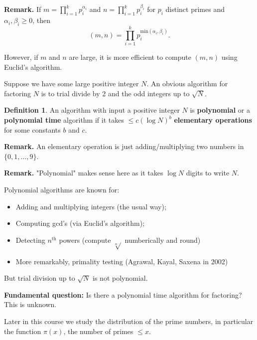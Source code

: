 \documentclass{article}
\theoremstyle{definition}
\newtheorem{defn}[theorem]{Definition}
\theoremstyle{remark}
\begin{document}
\textbf{Remark.} If $m = \prod_{i=1}^{k} p_i^{\alpha_i}$ and $n = \prod_{i=1}^{k} p_i^{\beta_i}$ for $p_i$ distinct primes and $\alpha_i, \beta_i \ge 0$, then \[
(m,n) = \prod_{i=1}^{k} p_i^{\text{min}(\alpha_i,\beta_i)}.
\]

However, if $m$ and $n$ are large, it is more efficient to compute $(m,n)$ using Euclid's algorithm.


\vspace{1mm}

Suppose we have some large positive integer $N$. An obvious algorithm for factoring $N$ is to trial divide by 2 and the odd integers up to $\sqrt{N}$.

\begin{defn}
    An algorithm with input a positive integer $N$ is \textbf{polynomial} or a \textbf{polynomial time} algorithm if it takes $\le c (\log N)^b$ \textbf{elementary operations}  for some constants $b$ and $c$. 
\end{defn}

\textbf{Remark.} An elementary operation is just adding/multiplying two numbers in $\{0,1,\ldots,9\}$.

\textbf{Remark.} "Polynomial" makes sense here as it takes $\log N$ digits to write $N$.

\vspace{1mm}

Polynomial algorithms are known for: 
\begin{itemize}
    \item Adding and multiplying integers (the usual way);
    \item Computing gcd's (via Euclid's algorithm);
    \item Detecting $n^{\text{th}}$ powers (compute $\sqrt[n]{}$ numberically and round)
    \item More remarkably, primality testing (Agrawal, Kayal, Saxena in 2002)
\end{itemize}

But trial division up to $\sqrt{N}$ is not polynomial.

\vspace{1mm}

\textbf{Fundamental question:} Is there a polynomial time algorithm for factoring? This is unknown.

Later in this course we study the distribution of the prime numbers, in particular the function $\pi(x)$, the number of primes $\le x$.
\end{document}
